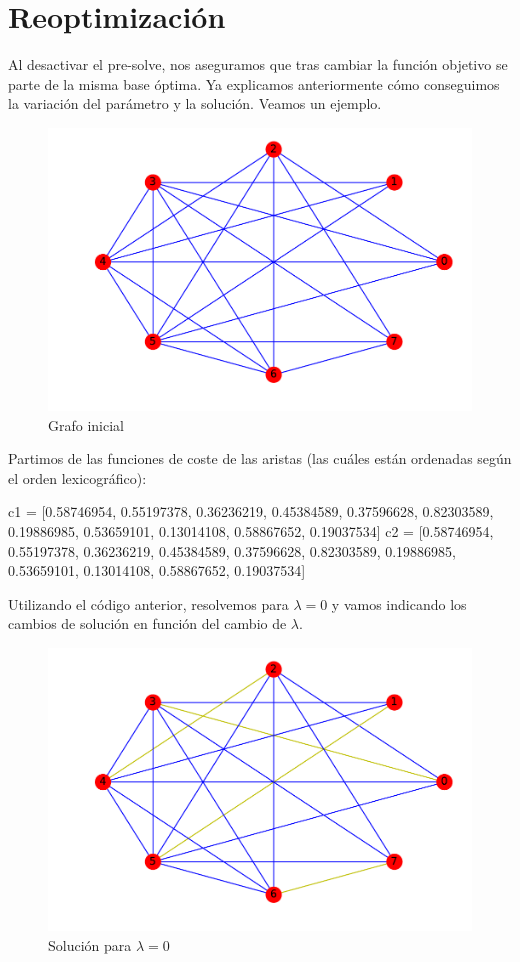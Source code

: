 \documentclass[twoside,a4paper,openright,12pt,tikz]{book}
\begin{document}
\section{Reoptimización}
Al desactivar el pre-solve, nos aseguramos que tras cambiar la función objetivo se parte de la misma base óptima. Ya explicamos anteriormente cómo conseguimos la variación del parámetro y la solución. Veamos un ejemplo.
\begin{figure}[h!]
\centering
\includegraphics[scale=0.45]{opt}
\caption{Grafo inicial}
\end{figure}
Partimos de las funciones de coste de las aristas (las cuáles están ordenadas según el orden lexicográfico):
\begin{pythone}
c1 = [0.58746954, 0.55197378, 0.36236219, 0.45384589, 0.37596628, 0.82303589, 0.19886985, 0.53659101, 0.13014108, 0.58867652, 0.19037534]
c2 = [0.58746954, 0.55197378, 0.36236219, 0.45384589, 0.37596628, 0.82303589, 0.19886985, 0.53659101, 0.13014108, 0.58867652, 0.19037534]
\end{pythone}
Utilizando el código anterior, resolvemos para $\lambda=0$ y vamos indicando los cambios de solución en función del cambio de $\lambda$.
\begin{figure}[h!]
\centering
\includegraphics[scale=0.5]{opt2}
\caption{Solución para $\lambda=0$}
\end{figure}
\end{document}
